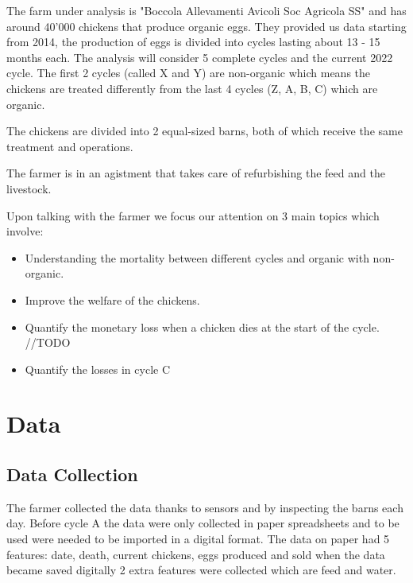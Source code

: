\documentclass[11pt]{article}
\begin{document}
The farm under analysis is "Boccola Allevamenti Avicoli Soc Agricola SS" and has around 40'000 chickens that produce organic eggs. They provided us data starting from 2014, the production of eggs is divided into cycles lasting about 13 - 15 months each. The analysis will consider 5 complete cycles and the current 2022 cycle. The first 2 cycles (called X and Y) are non-organic which means the chickens are treated differently from the last 4 cycles (Z, A, B, C) which are organic.

The chickens are divided into 2 equal-sized barns, both of which receive the same treatment and operations.

The farmer is in an agistment that takes care of refurbishing the feed and the livestock.

Upon talking with the farmer we focus our attention on 3 main topics which involve:
\begin{itemize}
    \item Understanding the mortality between different cycles and organic with non-organic.
    \item Improve the welfare of the chickens.
    \item Quantify the monetary loss when a chicken dies at the start of the cycle. //TODO
    \item Quantify the losses in cycle C
\end{itemize}

\section{Data}
\subsection{Data Collection}
The farmer collected the data thanks to sensors and by inspecting the barns each day. Before cycle A the data were only collected in paper spreadsheets and to be used were needed to be imported in a digital format.
The data on paper had 5 features: date, death, current chickens, eggs produced and sold
when the data became saved digitally 2 extra features were collected which are feed and water.
\end{document}
